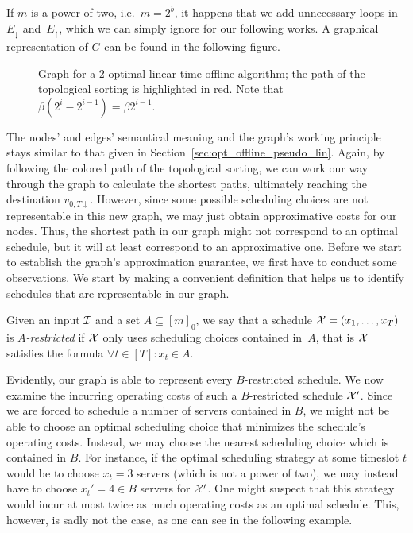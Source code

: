 If $m$ is a power of two, i.e.\ $m=2^b$, it happens that we add unnecessary loops in~$E_\downarrow$ and~$E_\uparrow$, which we can simply ignore for our following works.
A graphical representation of $G$ can be found in the following figure.
\begin{figure}[H]

\caption{Graph for a 2-optimal linear-time offline algorithm; the path of the topological sorting is highlighted in red. Note that $\beta(2^i-2^{i-1})=\beta2^{i-1}$.}
\label{fig:graph_lin_approx_2}
\end{figure}
The nodes' and edges' semantical meaning and the graph's working principle stays similar to that given in Section~\ref{sec:opt_offline_pseudo_lin}. Again, by following the colored path of the topological sorting, we can work our way through the graph to calculate the shortest paths, ultimately reaching the destination $v_{0,T\downarrow}$. However, since some possible scheduling choices are not representable in this new graph, we may just obtain approximative costs for our nodes. Thus, the shortest path in our graph might not correspond to an optimal schedule, but it will at least correspond to an approximative one. Before we start to establish the graph's approximation guarantee, we first have to conduct some observations. We start by making a convenient definition that helps us to identify schedules that are representable in our graph.
\begin{defn}
Given an input $\mathcal{I}$ and a set $A\subseteq[m]_0$, we say that a schedule $\mathcal{X}=(x_1,\dotsc,x_T)$ is \emph{$A$-restricted} if $\mathcal{X}$ only uses scheduling choices contained in~$A$, that is $\mathcal{X}$ satisfies the formula $\forall t\in[T]:x_t\in A$.
\end{defn}
Evidently, our graph is able to represent every $B$-restricted schedule. We now examine the incurring operating costs of such a $B$-restricted schedule $\mathcal{X}'$. Since we are forced to schedule a number of servers contained in $B$, we might not be able to choose an optimal scheduling choice that minimizes the schedule's operating costs. Instead, we may choose the nearest scheduling choice which is contained in $B$. For instance, if the optimal scheduling strategy at some timeslot $t$ would be to choose $x_t=3$ servers (which is not a power of two), we may instead have to choose $x_t'=4\in B$ servers for $\mathcal{X}'$. One might suspect that this strategy would incur at most twice as much operating costs as an optimal schedule. This, however, is sadly not the case, as one can see in the following example.
